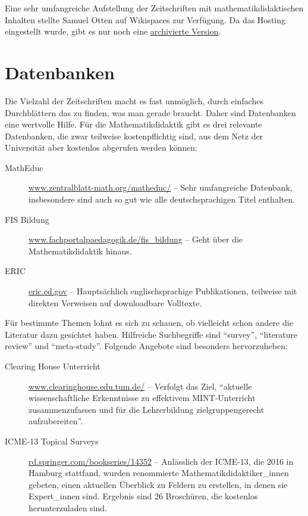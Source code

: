 \documentclass[ngerman,bibliography=totoc,oneside,12pt,a4paper]{scrbook}
\begin{document}
Eine sehr umfangreiche Aufstellung der Zeitschriften mit
mathematikdidaktischen Inhalten stellte Samuel Otten auf Wikispaces zur
Verfügung. Da das Hosting eingestellt wurde, gibt es nur noch eine
\href{https://web.archive.org/web/20180724110150/https://mathedjournals.wikispaces.com/}{archivierte
Version}.

\section{Datenbanken}\label{datenbanken}

Die Vielzahl der Zeitschriften macht es fast unmöglich, durch einfaches
Durchblättern das zu finden, was man gerade braucht. Daher sind
Datenbanken eine wertvolle Hilfe. Für die Mathematikdidaktik gibt es
drei relevante Datenbanken, die zwar teilweise kostenpflichtig sind, aus
dem Netz der Universität aber kostenlos abgerufen werden können:

\begin{description}
\item[MathEduc]
\href{https://www.zentralblatt-math.org/matheduc/}{www.zentralblatt-math.org/matheduc/}
-- Sehr umfangreiche Datenbank, insbesondere sind auch so gut wie alle
deutschsprachigen Titel enthalten.
\item[FIS Bildung]
\href{https://www.fachportalpaedagogik.de/fis_bildung}{www.fachportalpaedagogik.de/fis\_bildung}
-- Geht über die Mathematikdidaktik hinaus.
\item[ERIC]
\href{https://eric.ed.gov}{eric.ed.gov} -- Hauptsächlich
englischsprachige Publikationen, teilweise mit direkten Verweisen auf
downloadbare Volltexte.
\end{description}

Für bestimmte Themen lohnt es sich zu schauen, ob vielleicht schon
andere die Literatur dazu gesichtet haben. Hilfreiche Suchbegriffe sind
\enquote{survey}, \enquote{literature review} und \enquote{meta-study}.
Folgende Angebote sind besonders hervorzuheben:

\begin{description}
\item[Clearing House Unterricht]
\href{https://www.clearinghouse.edu.tum.de/}{www.clearinghouse.edu.tum.de/}
-- Verfolgt das Ziel, \enquote{aktuelle wissenschaftliche Erkenntnisse
zu effektivem MINT-Unterricht zusammenzufassen und für die Lehrerbildung
zielgruppengerecht aufzubereiten}.
\item[ICME-13 Topical Surveys]
\href{https://rd.springer.com/bookseries/14352}{rd.springer.com/bookseries/14352}
-- Anlässlich der ICME-13, die 2016 in Hamburg stattfand, wurden
renommierte Mathematikdidaktiker\_innen gebeten, einen aktuellen
Überblick zu Feldern zu erstellen, in denen sie Expert\_innen sind.
Ergebnis sind 26 Broschüren, die kostenlos herunterzuladen sind.
\end{description}
\end{document}

